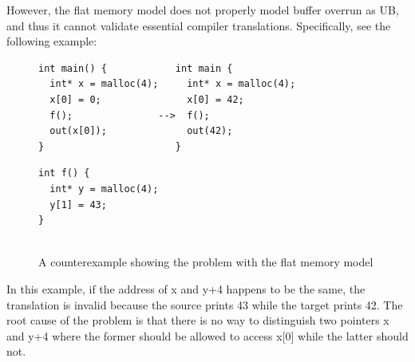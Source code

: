 However, the flat memory model does not properly model buffer overrun as UB, and thus it cannot validate essential compiler translations.
Specifically, see the following example:
\begin{figure}[h]
\begin{minipage}{1.2\linewidth}
\begin{minipage}{0.60\linewidth}
\begin{Verbatim}[frame=single]
int main() {            int main {
  int* x = malloc(4);     int* x = malloc(4);
  x[0] = 0;               x[0] = 42;
  f();               -->  f();
  out(x[0]);              out(42);
}                       }
\end{Verbatim}
\end{minipage}
\hspace*{-2.7mm}
\begin{minipage}{0.3\linewidth}
\begin{Verbatim}[frame=single]
int f() {
  int* y = malloc(4);
  y[1] = 43;
}


\end{Verbatim}
\end{minipage}
\end{minipage}
\caption{A counterexample showing the problem with the flat memory model}
\label{fig:flat-model}
\end{figure}

\noindent In this example, if the address of x and y+4 happens to be the same, the translation is invalid because the source prints 43 while the target prints 42.
The root cause of the problem is that there is no way to distinguish two pointers x and y+4 where the former should be allowed to access x[0] while the latter should not.


